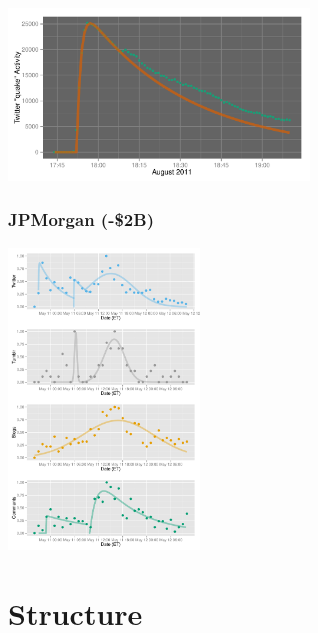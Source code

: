 \documentclass{beamer}
\begin{document}
\begin{frame}
  \begin{center}
    \includegraphics[width=8cm]{./imgs/SMP_va_quake_fit1.pdf}
  \end{center}
\end{frame}


\begin{frame}\frametitle{JPMorgan (-\$2B)}
 \hfill \includegraphics[height=8.0cm]{./imgs/SMP_JPMorgan.pdf}
\end{frame}


\section{Structure}
{
\begin{frame}
\textcolor{black} {
\hfill \Huge \insertsection}
\end{frame}
}
\end{document}
